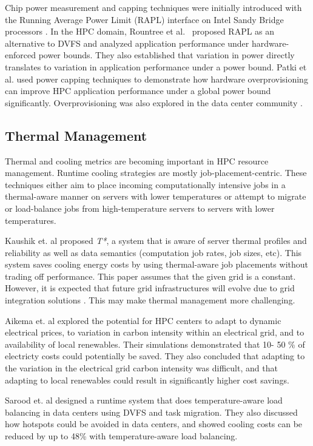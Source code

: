 Chip power measurement and capping techniques were initially introduced with the Running Average Power Limit (RAPL) interface on Intel Sandy Bridge processors \cite{IntelSDM,David2010}. In the HPC domain, Rountree et al.~\cite{Rountree2012} proposed RAPL as an alternative to DVFS and analyzed application performance under hardware-enforced power bounds. They also established that variation in power directly translates to variation in application performance under a power bound. Patki et al. \cite{Patki1} used power capping techniques to demonstrate how hardware overprovisioning can improve HPC application performance under a global power bound significantly. Overprovisioning was also explored in the data center community \cite{femal:04}.

\subsection{Thermal Management}
Thermal and cooling metrics are becoming important in HPC resource management. Runtime cooling strategies are mostly
job-placement-centric. These techniques either aim to place incoming computationally intensive jobs in a thermal-aware manner on servers with
lower temperatures or attempt to migrate or load-balance jobs from high-temperature servers to servers with lower temperatures.

Kaushik et. al \cite{kaushik_t*:_2012} proposed \emph{T*}, a system that is aware of server thermal profiles and reliability as well as data semantics (computation job rates, job sizes, etc). This system saves cooling energy costs by using thermal-aware job placements without trading off performance. This paper assumes that the given grid is a constant. However, it is expected that future grid infrastructures will evolve due to grid integration solutions \cite{he_architecture_2008}. This may make thermal management more challenging.

Aikema et. al \cite{aikema_electrical_2011} explored the potential for HPC centers to adapt to dynamic electrical prices, to variation in carbon intensity within an electrical grid, and to availability of local renewables. Their simulations demonstrated that 10- 50 \% of electricty costs could potentially be saved. They also concluded that adapting to the variation in the electrical grid carbon intensity was difficult, and that adapting to local renewables could result in significantly higher cost savings. 

Sarood et. al \cite{SaroodSC11} designed a runtime system that does temperature-aware load balancing in data centers using DVFS and task migration. They also discussed how hotspots could be avoided in data centers, and showed cooling costs can be reduced by up to 48\% with temperature-aware load balancing.

